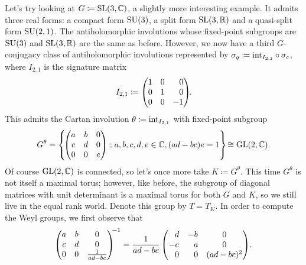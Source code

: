 \noindent\begin{example} Let's try looking at $G \coloneqq \textup{SL}(3, \mathbb{C})$, a slightly more interesting example. It admits three real forms: a compact form $\textup{SU}(3)$, a split form $\textup{SL}(3, \mathbb{R})$ and a quasi-split form $\textup{SU}(2, 1)$. The antiholomorphic involutions whose fixed-point subgroups are $\textup{SU}(3)$ and $\textup{SL}(3, \mathbb{R})$ are the same as before. However, we now have a third $G$-conjugacy class of antiholomorphic involutions represented by $\sigma_q \coloneqq \textup{int}_{I_{2,1}} \circ \sigma_c$, where $I_{2,1}$ is the signature matrix
\begin{align*}
\begin{split}
I_{2,1} \coloneqq \begin{pmatrix}1&0&\hphantom{-}0\\0&1&\hphantom{-}0\\0&0&-1\end{pmatrix}\!\!.
\end{split}
\end{align*}
\noindent This admits the Cartan involution $\theta \coloneqq \textup{int}_{I_{2,1}}$ with fixed-point subgroup
\begin{align*}
\begin{split}
G^\theta = \left\{\!\begin{pmatrix}a&b&0\\c&d&0\\0&0&e\end{pmatrix} : a, b, c, d, e \in \mathbb{C}, (ad - bc)e = 1\right\}\! \cong \textup{GL}(2, \mathbb{C}).
\end{split}
\end{align*}
\noindent Of course $\textup{GL}(2, \mathbb{C})$ is connected, so let's once more take $K \coloneqq G^\theta$. This time $G^\theta$ is not itself a maximal torus; however, like before, the subgroup of diagonal matrices with unit determinant is a maximal torus for both $G$ and $K$, so we still live in the equal rank world. Denote this group by $T = T_K$. In order to compute the Weyl groups, we first observe that\newpage
\begin{align*}
\begin{split}
\begin{pmatrix}a&b&0\\c&d&0\\0&0&\frac{1}{ad-bc}\end{pmatrix}^{\!\!-1} = \frac{1}{ad-bc}\begin{pmatrix}\hphantom{-}d&-b&0\\-c&\hphantom{-}a&0\\\hphantom{-}0&\hphantom{-}0&(ad-bc)^2\end{pmatrix}\!.

\end{split}
\end{align*}
\end{example}
